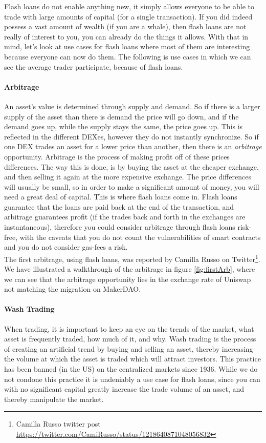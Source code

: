 Flash loans do not enable anything new, it simply allows everyone to be able
to trade with large amounts of capital (for a single transaction). If you did
indeed possess a vast amount of wealth (if you are a whale), then flash loans
are not really of interest to you, you can already do the things it allows. With
that in mind, let's look at use cases for flash loans where most of them are
interesting because everyone can now do them. The following is use cases in
which we can see the average trader participate, because of flash
loans\cite{attack}.


\paragraph{Arbitrage}
An asset's value is determined through supply and demand. So if there is a larger
supply of the asset than there is demand the price will go down, and if the
demand goes up, while the supply stays the same, the price goes up. This is
reflected in the different DEXes, however they do not instantly synchronize. So
if one DEX trades an asset for a lower price than another, then there is
an \textit{arbitrage} opportunity. Arbitrage is the process of making profit off
of these prices differences. The way this is done, is by buying the asset at the
cheaper exchange, and then selling it again at the more expensive exchange. The
price differences will usually be small, so in order to make a significant
amount of money, you will need a great deal of capital. This is where flash
loans come in. Flash loans guarantee that the loans are paid back at the end of
the transaction, and arbitrage guarantees profit (if the trades back and forth
in the exchanges are instantaneous), therefore you could consider arbitrage
through flash loans risk-free, with the caveats that you do not count the
vulnerabilities of smart contracts and you do not consider gas-fees a risk.\\

The first arbitrage, using flash loans, was reported by Camilla Russo
on Twitter\footnote{Camilla Russo twitter post
  \url{https://twitter.com/CamiRusso/status/1218640871048056832}}. We
have illustrated a walkthrough of the arbitrage in figure
\ref{fig:firstArb}, where we can see that the arbitrage opportunity
lies in the exchange rate of Uniswap not matching the migration on
MakerDAO.

\paragraph{Wash Trading} When trading, it is important to keep an eye
on the trends of the market, what asset is frequently traded, how much
of it, and why. Wash trading is the process of creating an artificial
trend by buying and selling an asset, thereby increasing the volume at
which the asset is traded which will attract investors. This practice
has been banned (in the US) on the centralized markets since
1936. While we do not condone this practice it is undeniably a use case for
flash loans, since you can with no significant capital greatly increase the
trade volume of an asset, and thereby manipulate the market.

